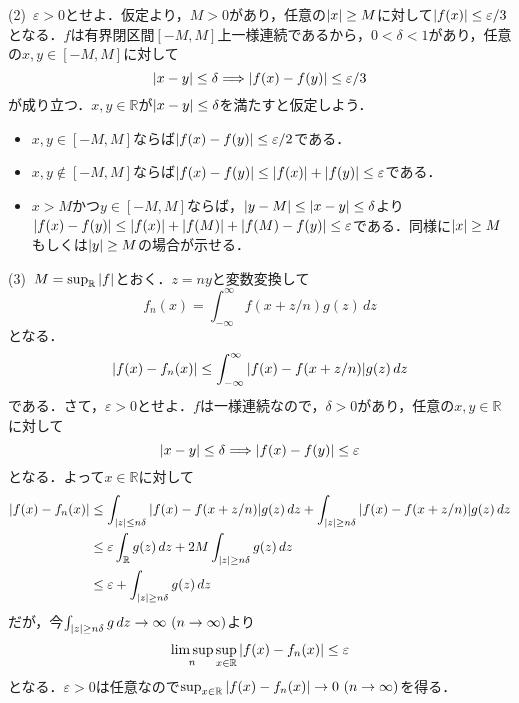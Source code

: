 \documentclass[a4j]{ltjsarticle}
\newcommand{\Rset}{\mathbb{R}}
\newcommand{\1}{\mathbbm{1}}
\numberwithin{equation}{section}
\theoremstyle{definition}
\begin{document}
(2)\ $\varepsilon>0$とせよ．仮定より，$M>0$があり，任意の$\abs{x}\geq M$に対して$\abs{f(x)}\leq \varepsilon/3$となる．$f$は有界閉区間$[-M,M]$上一様連続であるから，$0<\delta<1$があり，任意の$x,y\in [-M,M]$に対して
\begin{equation}
    \abs{x-y}\leq \delta\Longrightarrow \abs{f(x)-f(y)}\leq \varepsilon/3 
\end{equation}
が成り立つ．$x,y\in\Rset$が$\abs{x-y}\leq \delta$を満たすと仮定しよう．
\begin{itemize}
    \item $x,y\in[-M,M]$ならば$\abs{f(x)-f(y)}\leq \varepsilon/2$である．
    \item $x,y\notin [-M,M]$ならば$\abs{f(x)-f(y)}\leq \abs{f(x)}+\abs{f(y)}\leq \varepsilon$である．
    \item $x>M$かつ$y\in [-M,M]$ならば，$\abs{y-M}\leq \abs{x-y}\leq \delta$より$\abs{f(x)-f(y)}\leq \abs{f(x)}+\abs{f(M)}+\abs{f(M)-f(y)}\leq \varepsilon$である．同様に$\abs{x}\geq M$もしくは$\abs{y}\geq M$の場合が示せる．
\end{itemize}

(3)\ $M=\sup_{\Rset}\abs{f}$とおく．$z=ny$と変数変換して
\begin{equation}
    f_n(x)=\int_{-\infty}^{\infty} f(x+z/n)g(z)\,dz 
\end{equation}
となる．
\begin{align}
    \abs{f(x)-f_n(x)}\leq \int_{-\infty}^\infty \abs{f(x)-f(x+z/n)}g(z)\,dz 
\end{align}
である．さて，$\varepsilon>0$とせよ．$f$は一様連続なので，$\delta>0$があり，任意の$x,y\in \Rset$に対して
\begin{equation}
    \abs{x-y}\leq \delta\Longrightarrow \abs{f(x)-f(y)}\leq \varepsilon 
\end{equation}
となる．よって$x\in\Rset$に対して
\begin{align}
    \abs{f(x)-f_n(x)}&\leq \int_{\abs{z}\leq n\delta}\abs{f(x)-f(x+z/n)}g(z)\,dz+\int_{\abs{z}\geq n\delta} \abs{f(x)-f(x+z/n)}g(z)\,dz\\
    &\leq \varepsilon\int_{\Rset}g(z)\,dz+2M\int_{\abs{z}\geq n\delta}g(z)\,dz \\
    &\leq \varepsilon+\int_{\abs{z}\geq n\delta}g(z)\,dz 
\end{align}
だが，今$\int_{\abs{z}\geq n\delta}g\,dz\to \infty \ (n\to\infty)$より 
\begin{equation}
    \limsup_{n}\sup_{x\in\Rset}\abs{f(x)-f_n(x)}\leq \varepsilon 
\end{equation}
となる．$\varepsilon>0$は任意なので$\sup_{x\in\Rset}\abs{f(x)-f_n(x)}\to0\ (n\to\infty)$を得る．
\end{document}
